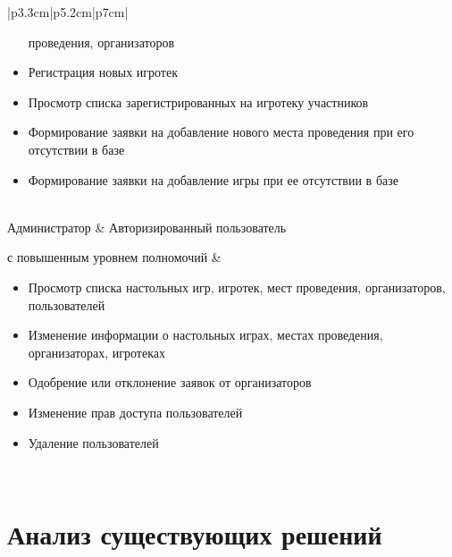 \begin{table}[h!]
\begin{center}
\begin{threeparttable}
\begin{tabular}{|p{3.3cm}|p{5.2cm}|p{7cm}|}
\begin{minipage}[t]{\linewidth}
\begin{itemize}[nosep,after=\strut]
                        проведения, организаторов\
                          \item Регистрация новых игротек
                          \item Просмотр списка зарегистрированных на игротеку
                        участников
                          \item Формирование заявки на добавление нового места
                        проведения при его отсутствии в базе
                          \item Формирование заявки на добавление игры при ее
                        отсутствии в базе
                      \end{itemize}
                  \end{minipage}\\
            \hline
            Администратор & Авторизированный пользователь\par
                            с повышенным уровнем полномочий
                  & \begin{minipage}[t]{\linewidth}
                      \begin{itemize}[nosep,after=\strut]
                          \item Просмотр списка настольных игр, игротек, мест
                        проведения, организаторов, пользователей
                          \item Изменение информации о настольных играх, местах
                        проведения, организаторах, игротеках
                          \item Одобрение или отклонение заявок от
                        организаторов
                          \item Изменение прав доступа пользователей
                          \item Удаление пользователей
                      \end{itemize}
                  \end{minipage}\\
            \hline
        \end{tabular}
    \end{threeparttable}
    \end{center}
\end{table} 


\section{Анализ существующих решений}

